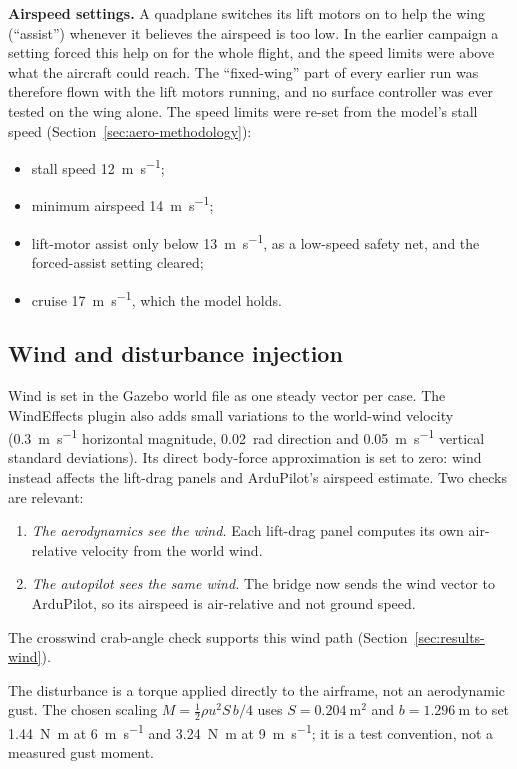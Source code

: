 \documentclass{article}
\begin{document}
\textbf{Airspeed settings.} A quadplane switches its lift motors on to help the wing (``assist'') whenever it believes the airspeed is too low. In the earlier campaign a setting forced this help on for the whole flight, and the speed limits were above what the aircraft could reach. The ``fixed-wing'' part of every earlier run was therefore flown with the lift motors running, and no surface controller was ever tested on the wing alone. The speed limits were re-set from the model's stall speed (Section~\ref{sec:aero-methodology}):
\begin{itemize}
    \item stall speed \SI{12}{\meter\per\second};
    \item minimum airspeed \SI{14}{\meter\per\second};
    \item lift-motor assist only below \SI{13}{\meter\per\second}, as a low-speed safety net, and the forced-assist setting cleared;
    \item cruise \SI{17}{\meter\per\second}, which the model holds.
\end{itemize}

\subsection{Wind and disturbance injection}
\label{sec:wind-injection}
Wind is set in the Gazebo world file as one steady vector per case. The WindEffects plugin also adds small variations to the world-wind velocity (\SI{0.3}{\meter\per\second} horizontal magnitude, \SI{0.02}{\radian} direction and \SI{0.05}{\meter\per\second} vertical standard deviations). Its direct body-force approximation is set to zero: wind instead affects the lift-drag panels and ArduPilot's airspeed estimate. Two checks are relevant:
\begin{enumerate}
    \item \emph{The aerodynamics see the wind.} Each lift-drag panel computes its own air-relative velocity from the world wind.
    \item \emph{The autopilot sees the same wind.} The bridge now sends the wind vector to ArduPilot, so its airspeed is air-relative and not ground speed.
\end{enumerate}
The crosswind crab-angle check supports this wind path (Section~\ref{sec:results-wind}).

The disturbance is a torque applied directly to the airframe, not an aerodynamic gust. The chosen scaling $M=\tfrac12\rho u^2 S\,b/4$ uses $S=\SI{0.204}{\meter\squared}$ and $b=\SI{1.296}{\meter}$ to set \SI{1.44}{\newton\meter} at \SI{6}{\meter\per\second} and \SI{3.24}{\newton\meter} at \SI{9}{\meter\per\second}; it is a test convention, not a measured gust moment.
\end{document}
